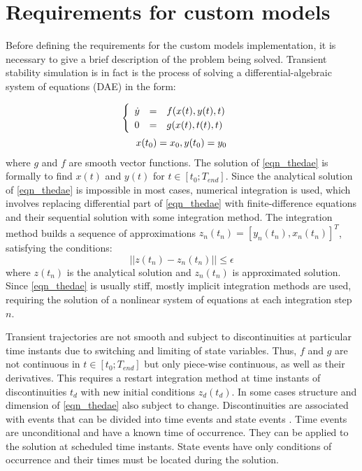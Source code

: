 \documentclass[lettersize,journal]{IEEEtran}
\begin{document}
\section{Requirements for custom models}
Before defining the requirements for the custom models implementation, it is necessary to give a brief description of the problem being solved. 
Transient stability simulation is in fact is the process of solving a differential-algebraic system of equations (DAE) in the form:

\begin{equation}
	\label{eqn_thedae}
	\begin{array}{c}
		\begin{cases}
			\begin{array}{lcl}
				\dot{y}&=&f(x(t), y(t), t) \\
			 	      0&=&g(x(t), t(t), t)\\
			\end{array}
		\end{cases} 
	\vspace{0.5em} \\
	 x(t_0)=x_0, y(t_0)=y_0 \\
	\end{array}
\end{equation}
\noindent where \(g\) and \(f\) are smooth vector functions. The solution of \eqref{eqn_thedae} is formally to find \(x(t)\) and \(y(t)\) for \(t\in[t_0;T_{end}]\). Since the analytical solution of \eqref{eqn_thedae} is impossible in most cases, numerical integration is used, which involves replacing differential part
of \eqref{eqn_thedae} with finite-difference equations and their sequential solution with some integration
method. The integration method builds a sequence of approximations \(z_n(t_n)=[y_n(t_n), x_n(t_n)]^T\), satisfying
the conditions:
\begin{equation}
	\label{eqn_fdapprox}
	\vert\vert z(t_n)-z_n(t_n) \vert\vert \leq \epsilon
\end{equation}
\noindent where \(z(t_n)\) is the analytical solution and \(z_n(t_n)\) is approximated solution. Since \eqref{eqn_thedae} is usually stiff,
mostly implicit integration methods are used, requiring the solution of a nonlinear system of equations at each integration step \(n\).

Transient trajectories are not smooth and subject to discontinuities at particular time instants due to switching and limiting of state variables.
Thus, \(f\) and \(g\) are not continuous in \(t\in[t_0;T_{end}]\) but only piece-wise continuous, as well as their derivatives. This requires a restart integration
method at time instants of discontinuities \(t_d\) with new initial conditions \(z_d(t_d)\). In some cases structure and dimension of \eqref{eqn_thedae}
also subject to change. Discontinuities are associated with events that can be divided into time events and state events \cite{cellier}. Time events are 
unconditional and have a known time of occurrence. They can be applied to the solution at scheduled time instants. State events have only conditions of occurrence and
their times must be located during the solution.
\end{document}

